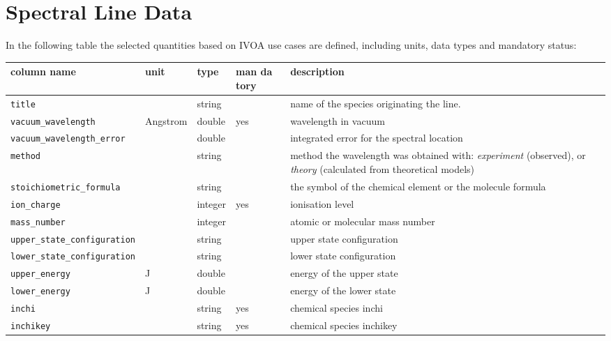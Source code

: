 \documentclass[11pt,a4paper]{ivoa}
\begin{document}
\section{Spectral Line Data}\label{quantities}

In the following table the selected quantities based on IVOA use cases
are defined, including units, data types and mandatory status:


\begin{table}[H]
\small
\begin{tabular}{|l|l|l|p{0.8cm}|p{4cm}|}%
\hline
\textbf{column name} & \textbf{unit} & \textbf{type} & \textbf{man da tory} & 
\textbf{description} \\
\hline
\hline
\texttt{title} & & string & & name of the species originating  the line.  \\
\hline
\texttt{vacuum\_wavelength} & Angstrom & double & yes &  wavelength in vacuum \\
\hline
\texttt{vacuum\_wavelength\_error} & & double & & integrated error for the spectral location \\
\hline
\texttt{method} && string& & method the wavelength was obtained with:
\textit{experiment} (observed), or \textit{theory} (calculated from theoretical models) \\ 
\hline
\texttt{stoichiometric\_formula} & & string & &  the symbol of the chemical element or the 
molecule formula\\
\hline
\texttt{ion\_charge} & & integer & yes & ionisation level\\
\hline
\texttt{mass\_number} & & integer &  & atomic or molecular mass number\\
\hline
\texttt{upper\_state\_configuration} & & string & & upper state configuration\\
\hline
\texttt{lower\_state\_configuration} & & string & & lower state configuration\\
\hline
\texttt{upper\_energy} & J  & double & & energy of the upper state \\
\hline
\texttt{lower\_energy} & J & double & & energy of the lower state\\
\hline
\texttt{inchi} & & string & yes & chemical species inchi \\
\hline
\texttt{inchikey} & & string & yes & chemical species inchikey \\

\end{tabular}
\end{table}
\end{document}
